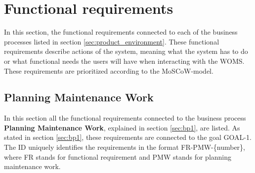 \section{Functional requirements}
\label{sec:functional_requirements}

In this section, the functional requirements connected to each of the business processes listed in section \ref{sec:product_environment}. These functional requirements describe actions of the system, meaning what the system has to do or what functional needs the users will have when interacting with the WOMS. These requirements are prioritized according to the MoSCoW-model. 

\subsection{Planning Maintenance Work}
\label{sub:planning_maintenance_work}
In this section all the functional requirements connected to the business process \textbf{Planning Maintenance Work}, explained in section \ref{sec:bp1}, are listed. As stated in section \ref{sec:bp1}, these requirements are connected to the goal GOAL-1. The ID uniquely identifies the requirements in the format FR-PMW-\{number\}, where  FR stands for functional requirement and PMW stands for planning maintenance work. 


